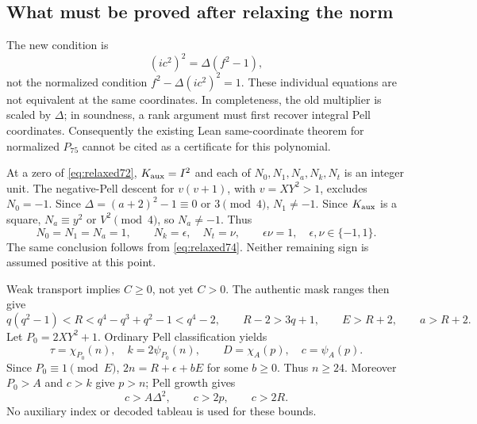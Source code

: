 \subsection{What must be proved after relaxing the norm}
The new condition is
\[
 (ic^2)^2=\Delta(f^2-1),
\]
not the normalized condition $f^2-\Delta(ic^2)^2=1$.
These individual equations are not equivalent at the same coordinates.
In completeness, the old multiplier is scaled by $\Delta$; in soundness,
a rank argument must first recover integral Pell coordinates. Consequently
the existing Lean same-coordinate theorem for normalized $P_{75}$ cannot
be cited as a certificate for this polynomial.

At a zero of \eqref{eq:relaxed72}, $K_{\rm aux}=I^2$ and each of
$N_0,N_1,N_a,N_k,N_t$ is an integer unit. The negative-Pell descent for
$v(v+1)$, with $v=XY^2>1$, excludes $N_0=-1$. Since
$\Delta=(a+2)^2-1\equiv0$ or $3\pmod4$, $N_1\ne-1$.
Since $K_{\rm aux}$ is a square, $N_a\equiv y^2$ or $V^2\pmod4$,
so $N_a\ne-1$. Thus
\begin{equation}\label{eq:relaxedunits}
 N_0=N_1=N_a=1,\qquad N_k=\epsilon,\quad N_t=\nu,
 \qquad \epsilon\nu=1,\quad \epsilon,\nu\in\{-1,1\}.
\end{equation}
The same conclusion follows from \eqref{eq:relaxed74}. Neither remaining
sign is assumed positive at this point.

Weak transport implies $C\ge0$, not yet $C>0$. The authentic mask ranges
then give
\[
 q(q^2-1)<R<q^4-q^3+q^2-1<q^4-2,\qquad
 R-2>3q+1,\qquad E>R+2,\qquad a>R+2.
\]
Let $P_0=2XY^2+1$. Ordinary Pell classification yields
\[
 \tau=\chi_{P_0}(n),\quad k=2\psi_{P_0}(n),\qquad
 D=\chi_A(p),\quad c=\psi_A(p).
\]
Since $P_0\equiv1\pmod E$,
$2n=R+\epsilon+bE$ for some $b\ge0$. Thus $n\ge24$.
Moreover $P_0>A$ and $c>k$ give $p>n$; Pell growth gives
\begin{equation}\label{eq:relaxedlarge}
 c>A\Delta^2,\qquad c>2p,\qquad c>2R.
\end{equation}
No auxiliary index or decoded tableau is used for these bounds.

